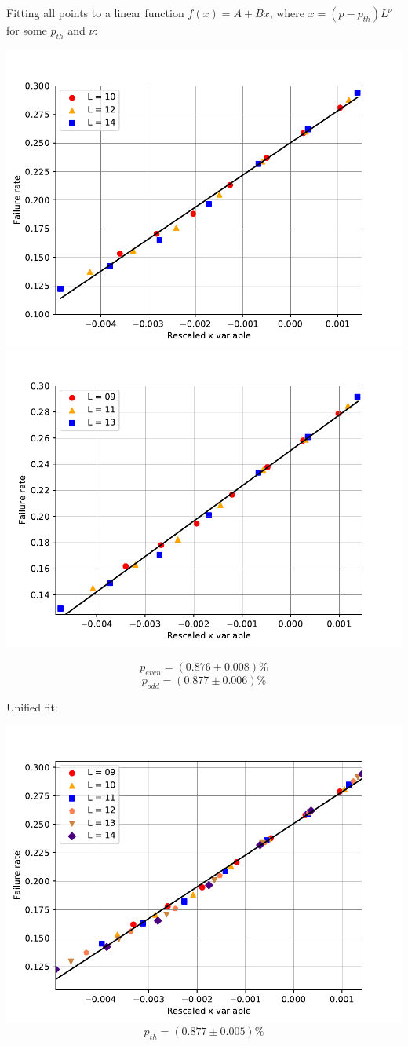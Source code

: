 \documentclass[pra]{revtex4-1}
\begin{document}
\noindent Fitting all points to a linear function $f(x) = A + Bx$, where $x=(p-p_{th})L^{\nu}$ for some $p_{th}$ and $\nu$: 
  
\includegraphics[width=.49\textwidth]{../graphs-paper2/pte-dephasing-even-rescaled.pdf}
\includegraphics[width=.49\textwidth]{../graphs-paper2/pte-dephasing-odd-rescaled.pdf}

\[  p_{even} = (0.876 \pm 0.008)\% \]
\[  p_{odd} = (0.877 \pm 0.006)\% \]
\clearpage 

Unified fit: \begin{center} 

\includegraphics[width=.9\textwidth]{../graphs-paper2/pte-dephasing-rescaled.pdf}
\[  p_{th} = (0.877 \pm 0.005)\% \] \end{center}
\clearpage 
\end{document}
